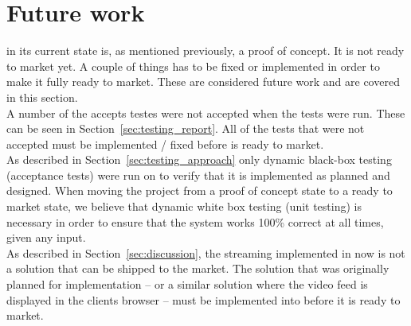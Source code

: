 
\section{Future work}

\projectname{} in its current state is, as mentioned previously, a proof of concept.
It is not ready to market yet. 
A couple of things has to be fixed or implemented in order to make it fully ready to market. 
These are considered future work and are covered in this section. \\

A number of the accepts testes were not accepted when the tests were run.
These can be seen in Section~\ref{sec:testing_report}.
All of the tests that were not accepted must be implemented / fixed before \projectname{} is ready to market. \\

As described in Section~\ref{sec:testing_approach} only dynamic black-box testing (acceptance tests) were run on \projectname{} to verify that it is implemented as planned and designed.
When moving the project from a proof of concept state to a ready to market state, we believe that dynamic white box testing (unit testing) is necessary in order to ensure that the system works 100\% correct at all times, given any input. \\

As described in Section~\ref{sec:discussion}, the streaming implemented in \projectname{} now is not a solution that can be shipped to the market. 
The solution that was originally planned for implementation -- or a similar solution where the video feed is displayed in the clients browser -- must be implemented into \projectname{} before it is ready to market. 
